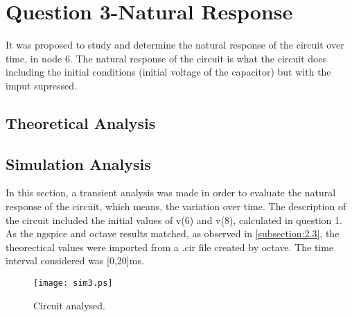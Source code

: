 \section{Question 3-Natural Response}
It was proposed to study and determine the natural response of the circuit over time, in node 6. The natural response of the circuit is what the circuit does including the initial conditions (initial voltage of the capacitor) but with the imput supressed. 

\subsection{Theoretical Analysis}




\subsection{Simulation Analysis}
In this section, a transient analysis was made in order to evaluate the natural response of the circuit, which means, the variation over time. The description of the circuit included the initial values of v(6) and v(8), calculated in question 1. As the ngspice and octave results matched, as observed in \ref{subsection:2.3}, the theorectical values were imported from a .cir file created by octave.
The time interval considered was [0,20]ms.
\begin{figure}[ht] \centering
\texttt{[image: sim3.ps]}
\caption{Circuit analysed.}
\label{fig:sim3}
\end{figure}
